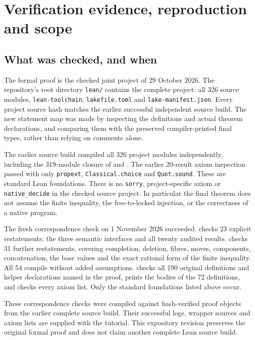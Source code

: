 \section{Verification evidence, reproduction and scope}\label{app:verification}
\subsection{What was checked, and when}
The formal proof is the checked joint project of 29 October 2026. The repository's root directory \texttt{lean/} contains the
complete project: all 326 source modules, \texttt{lean-toolchain},
\texttt{lakefile.toml} and \texttt{lake-manifest.json}. Every project
source hash matches the earlier successful independent source build.
The new statement map was made by inspecting the definitions and
actual theorem declarations, and comparing them with the preserved
compiler-printed final types, rather than relying on comments alone.

The earlier source build compiled all 326 project modules independently,
including the 319-module closure of  and
. The earlier 20-result axiom inspection passed
with only \texttt{propext}, \texttt{Classical.choice} and
\texttt{Quot.sound}. These are standard Lean foundations. There is no
\texttt{sorry}, project-specific axiom or \texttt{native\_decide} in
the checked source project. In particular the final theorem does not
assume the finite inequality, the free-to-locked injection, or the
correctness of a native program.

The fresh correspondence check on 1 November 2026 succeeded.
 checks 23 explicit
restatements: the three semantic interfaces and all twenty audited
results.  checks 31 further
restatements, covering completion, deletion, fibres, moves, components,
concatenation, the base values and the exact rational form of the finite
inequality. All 54 compile without added assumptions.
 checks all 190 original
definitions and helper declarations named in the proof, prints the
bodies of the 72 definitions, and checks every axiom list. Only the
standard foundations listed above occur.

These correspondence checks were compiled against hash-verified proof
objects from the earlier complete source build. Their successful logs,
wrapper sources and axiom lists are supplied with the tutorial. This
expository revision preserves the original formal proof and does not
claim another complete Lean source build.

